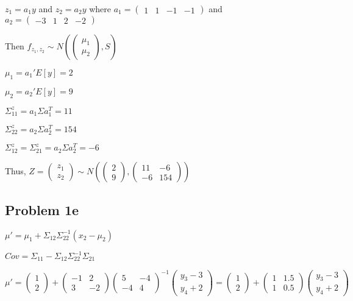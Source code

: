 \documentclass[a4paper]{article}
\begin{document}
$z_1=a_1y$ and $z_2 = a_2y$ where $a_1 = \begin{pmatrix}1 & 1 & -1 & -1 \end{pmatrix}$
and $a_2 = \begin{pmatrix}-3 & 1 & 2 & -2 \end{pmatrix}$

Then $f_{z_1,z_2} \sim N(\begin{pmatrix} \mu_1 \\ \mu_2 \end{pmatrix}, S)$

$\mu_1 = a_1'E[y] = 2$

$\mu_2 = a_2'E[y] = 9$

$\Sigma^z_{11} = a_1\Sigma a_1^T = 11$

$\Sigma^z_{22} = a_2\Sigma a_2^T = 154$

$\Sigma^z_{12} =  \Sigma^z_{21} =  a_2\Sigma a_2^T = -6$


Thus, $Z = \begin{pmatrix} z_1 \\ z_2 \end{pmatrix}
\sim N(\begin{pmatrix} 2\\ 9\end{pmatrix}, \begin{pmatrix} 11 & -6\\ 
-6 & 154\end{pmatrix})$ 

\subsection*{Problem 1e}

$\mu' = \mu_1 + \Sigma_{12}\Sigma_{22}^{-1}(x_2-\mu_2)$

$Cov = \Sigma_{11} - \Sigma_{12}\Sigma_{22}^{-1}\Sigma_{21}$



$\mu' = \begin{pmatrix}1 \\ 2 \end{pmatrix} + \begin{pmatrix} -1 & 2\\ 3 & -2 \end{pmatrix} \begin{pmatrix} 5 & -4\\ -4 & 4\end{pmatrix}^{-1} \begin{pmatrix}y_3-3\\ y_4+2\end{pmatrix} = \begin{pmatrix}1 \\ 2 \end{pmatrix} + \begin{pmatrix} 1&1.5\\ 1 & 0.5 \end{pmatrix} \begin{pmatrix}y_3-3\\ y_4+2\end{pmatrix}$
\end{document}
